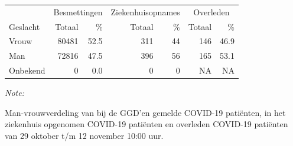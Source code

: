 \documentclass[
  english,
  man,floatsintext]{apa6}
\begin{document}
\begin{table}
\centering\begingroup\fontsize{11}{13}\selectfont

\begin{threeparttable}
\begin{tabular}{lrrrrrr}
\toprule
\multicolumn{1}{c}{ } & \multicolumn{2}{c}{Besmettingen} & \multicolumn{2}{c}{Ziekenhuisopnames} & \multicolumn{2}{c}{Overleden} \\
\cmidrule(l{3pt}r{3pt}){2-3} \cmidrule(l{3pt}r{3pt}){4-5} \cmidrule(l{3pt}r{3pt}){6-7}
Geslacht & Totaal & \% & Totaal & \% & Totaal & \%\\
\midrule
Vrouw & 80481 & 52.5 & 311 & 44 & 146 & 46.9\\
Man & 72816 & 47.5 & 396 & 56 & 165 & 53.1\\
Onbekend & 0 & 0.0 & 0 & 0 & NA & NA\\
\bottomrule
\end{tabular}
\begin{tablenotes}
\item \textit{Note: } 
\item Man-vrouwverdeling van bij de GGD’en gemelde COVID-19 patiënten, in het ziekenhuis opgenomen COVID-19 patiënten en overleden COVID-19 patiënten van 29 oktober t/m 12 november 10:00 uur.
\end{tablenotes}
\end{threeparttable}
\endgroup{}
\end{table}
\newpage
\end{document}
